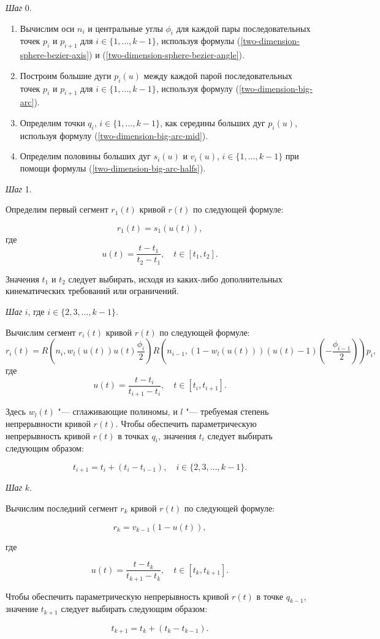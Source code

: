 \bigskip
\textit{Шаг} 0.

\begin{enumerate}
\item Вычислим оси $n_i$ и центральные углы $\phi_i$ для каждой пары последовательных точек $p_i$ и $p_{i+1}$ для
$i \in \{1,\dots,k-1\}$, используя формулы (\ref{two-dimension-sphere-bezier-axis}) и
(\ref{two-dimension-sphere-bezier-angle}).
\item Построим большие дуги $p_i(u)$ между каждой парой последовательных точек $p_i$ и $p_{i+1}$ для
$i \in \{1,\dots,k-1\}$, используя формулу (\ref{two-dimension-big-arc}).
\item Определим точки $q_i$, $i \in \{1,\dots,k-1\}$, как середины больших дуг $p_i(u)$, используя формулу
(\ref{two-dimension-big-arc-mid}).
\item Определим половины больших дуг $s_i(u)$ и $v_i(u)$, $i \in \{1,\dots,k-1\}$ при помощи формулы
(\ref{two-dimension-big-arc-halfs}).
\end{enumerate}

\bigskip
\textit{Шаг} 1.

Определим первый сегмент $r_1(t)$ кривой $r(t)$ по следующей формуле:

$$
r_1(t)=s_1(u(t)),
$$
\noindent где
$$
u(t)=\frac{t-t_1}{t_2-t_1}, \quad t \in [t_1,t_2].
$$

Значения $t_1$ и $t_2$ следует выбирать, исходя из каких-либо дополнительных кинематических требований или ограничений.

\bigskip
\textit{Шаг} $i$, где $i \in \{2,3,\dots,k-1\}$.

Вычислим сегмент $r_i(t)$ кривой $r(t)$ по следующей формуле:
$$
r_i(t)=R(n_i,w_l(u(t))u(t)\frac{\phi_i}{2})R(n_{i-1},(1-w_l(u(t)))(u(t)-1)(-\frac{\phi_{i-1}}{2}))p_i,
$$
\noindent где
$$
u(t)=\frac{t-t_i}{t_{i+1}-t_i}, \quad t \in [t_i,t_{i+1}].
$$

Здесь $w_l(t)$ "--- сглаживающие полиномы, и $l$ "--- требуемая степень непрерывности кривой $r(t)$. Чтобы обеспечить
параметрическую непрерывность кривой $r(t)$ в точках $q_i$, значения $t_i$ следует выбирать следующим образом:

$$
t_{i+1}=t_i+(t_i-t_{i-1}), \quad i \in \{2,3,\dots,k-1\}.
$$

\bigskip
\textit{Шаг} $k$.

Вычислим последний сегмент $r_k$ кривой $r(t)$ по следующей формуле:

$$
r_k=v_{k-1}(1-u(t)),
$$

\noindent где

$$
u(t)=\frac{t-t_k}{t_{k+1}-t_k}, \quad t \in [t_k,t_{k+1}].
$$

Чтобы обеспечить параметрическую непрерывность кривой $r(t)$ в точке $q_{k-1}$, значение $t_{k+1}$ следует выбирать
следующим образом:

$$
t_{k+1}=t_k+(t_k-t_{k-1}).
$$
